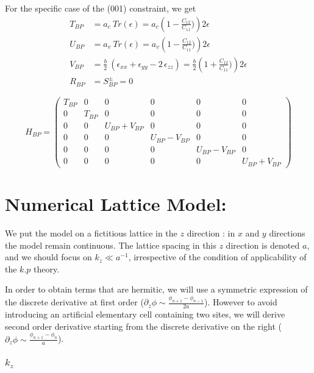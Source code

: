 \documentclass[prb,aps]{revtex4}
\begin{document}
		For the specific case of the (001) constraint, we get
		\begin{align}
			T_{BP} &= a_c~ Tr(ϵ) = a_c \left( 1-\frac{C_{12}}{C_{11}}) \right) 2 ϵ  \\
			U_{BP} &= a_v~ Tr(ϵ) = a_v \left( 1-\frac{C_{12}}{C_{11}}) \right) 2 ϵ    \\
			V_{BP} &= \frac{b}{2}~ \left( ϵ_{xx} + ϵ_{yy} - 2\,ϵ_{zz} \right) = \frac{b}{2}   \left( 1+\frac{C_{12}}{C_{11}})   \right) 2 ϵ   \\
			R_{BP} &= S^\pm_{BP} =0
		\end{align}

		\begin{equation}
			\label{eq:H-BP2}
			H_{BP}=
			\begin{pmatrix}
				T_{BP} & 0 & 0 &0 &0 &0     \\
				0 & T_{BP} & 0 & 0 &0 &0   \\
				0 & 0 & U_{BP}+V_{BP} & 0& 0 & 0  \\
				0 & 0 &0 & U_{BP}-V_{BP} & 0 & 0  \\
				0& 0 & 0& 0 & U_{BP}-V_{BP} &0 \\
				0 & 0 & 0 & 0 & 0 & U_{BP}+V_{BP}
			\end{pmatrix}
		\end{equation}


\section{Numerical Lattice Model:}

    We put the model on a fictitious lattice in the $z$ direction : in $x$ and $y$ directions the model remain continuous. The lattice spacing in this $z$ direction is denoted $a$, and we should focus on $k_z \ll a^{-1}$, irrespective of the condition of applicability of the $k.p$ theory.

    In order to obtain terms that are hermitic, we will use a symmetric expression of the discrete derivative at first order ($\partial_z ϕ \sim \frac{ϕ_{n+1} - ϕ_{n-1}}{2a}$). However to avoid introducing an artificial elementary cell containing two sites, we will derive second order derivative starting from the discrete derivative on the right ($\partial_z ϕ \sim \frac{ϕ_{n+1} - ϕ_{n}}{a}$).

    \subsubsection{$k_z$}
\end{document}

